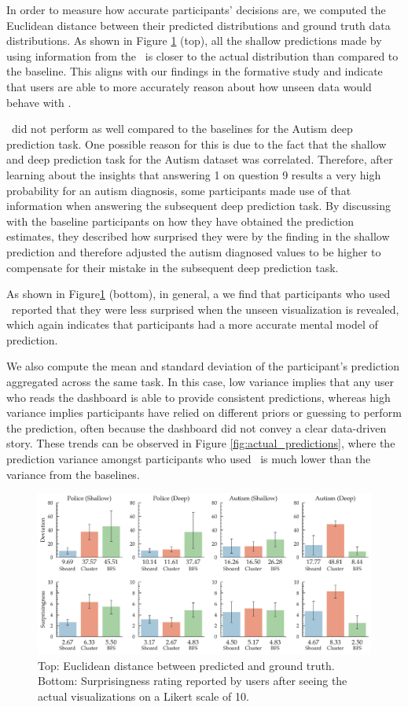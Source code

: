  In order to measure how accurate participants' decisions are, we computed the Euclidean distance between their predicted distributions and ground truth data distributions. As shown in Figure \ref{fig:distance} (top), all the shallow predictions made by using information from the \system\ is closer to the actual distribution than compared to the baseline. This aligns with our findings in the formative study and indicate that users are able to more accurately reason about how unseen data would behave with \system.
\par \system\ did not perform as well compared to the baselines for the Autism deep prediction task. One possible reason for this is due to the fact that the shallow and deep prediction task for the Autism dataset was correlated. Therefore, after learning about the insights that answering 1 on question 9 results a very high probability for an autism diagnosis, some participants made use of that information when answering the subsequent deep prediction task. By discussing with the baseline participants on how they have obtained the prediction estimates, they described how surprised they were by the finding in the shallow prediction and therefore adjusted the autism diagnosed values to be higher to compensate for their mistake in the subsequent deep prediction task.
\par As shown in Figure\ref{fig:distance} (bottom), in general, a we find that participants who used \system\ reported that they were less surprised when the unseen visualization is revealed, which again indicates that participants had a more accurate mental model of prediction.
\par We also compute the mean and standard deviation of the participant's prediction aggregated across the same task. In this case, low variance implies that any user who reads the dashboard is able to provide consistent predictions, whereas high variance implies participants have relied on different priors or guessing to perform the prediction, often because the dashboard did not convey a clear data-driven story. These trends can be observed in Figure \ref{fig:actual_predictions}, where the prediction variance amongst participants who used \system\ is much lower than the variance from the baselines.
\begin{figure}[bht]
\centering
\includegraphics[width=\linewidth]{figures/Devation_Surprisingness.pdf}
\caption{Top: Euclidean distance between predicted and ground truth. Bottom: Surprisingness rating reported by users after seeing the actual visualizations on a Likert scale of 10.}
\label{fig:distance}
\end{figure}
